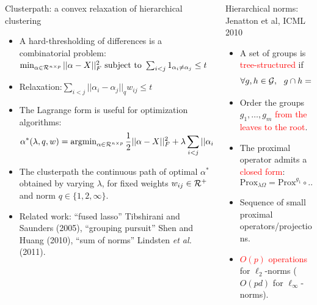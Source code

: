 \documentclass[final]{beamer}
\newcommand{\rred}[1]{{\textcolor{red}{#1}}}
\begin{document}
\begin{frame}{}
\begin{columns}[T]
\begin{column}{0.315\paperwidth}
\begin{block}{Clusterpath: a convex relaxation of hierarchical
    clustering}
\begin{itemize}
\item A hard-thresholding of differences is a combinatorial problem:
$
 \min_{    \alpha\in{\mathcal R}^{n\times p}}       ||\alpha-X||_F^2 \text{  subject to  }
\sum_{i<j}1_{\alpha_i\neq\alpha_j} \leq t$
\item Relaxation:$\sum_{i<j}||\alpha_i-\alpha_j||_q w_{ij}\leq t$
\item The Lagrange form is useful for optimization algorithms:
$$
\alpha^*(\lambda,q,w)=\operatorname{argmin}_{\alpha\in{\mathcal R}^{n\times p}}
\frac 1 2||\alpha-X||_F^2+\lambda\sum_{i<j}||\alpha_i-\alpha_j||_q w_{ij}
$$
\item The \alert<1>{clusterpath} the continuous path of optimal
  $\alpha^*$ obtained by varying $\lambda$, for fixed weights
  $w_{ij}\in{\mathcal R}^+$ and norm $q\in\{1,2,\infty\}$.
\item
 Related work: ``fused lasso'' Tibshirani and Saunders (2005),
``grouping pursuit'' Shen and Huang (2010), ``sum of norms'' Lindsten
\emph{et al.}  (2011).
\end{itemize}


\end{block}


\end{column}\hfill

\begin{column}{0.315\linewidth}
\begin{block}{Hierarchical norms: Jenatton et al, ICML 2010} 
\begin{itemize}
   \item A set of groups is \rred{tree-structured} if $$\forall g,h \in {\mathcal G},~~ g \cap h = \emptyset ~~\text{or}~~ g \subset h ~~\text{or}~~ h \subset g.$$
   \item Order the groups $g_1,\ldots,g_m$ \rred{from the leaves to the root}.
   \item The proximal operator admits a \rred{closed form}: $$\text{Prox}_{\lambda\Omega} = \text{Prox}^{g_1} \circ \ldots \circ \text{Prox}^{g_m}.$$
   \item Sequence of small proximal operators/projections.
   \item \rred{$O(p)$ operations} for $\ell_2$-norms ($O(pd)$ for $\ell_\infty$-norms).
\end{itemize}
\end{block}


\end{column}
\end{columns}
\end{frame}
\end{document}
